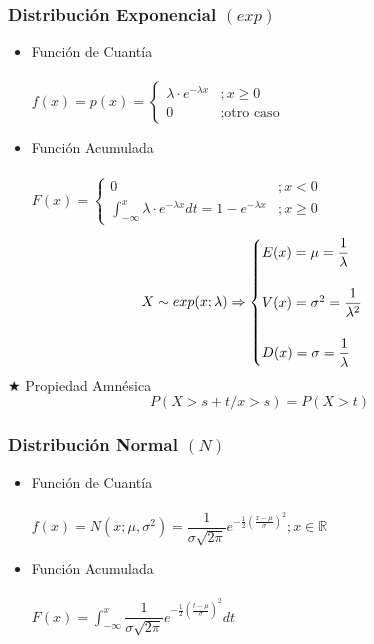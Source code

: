 \documentclass[10pt,letterpaper]{article}
\begin{document}
\subsubsection{Distribución Exponencial $(exp)$}
\begin{multicols}{2}
\begin{itemize}
\item Función de Cuantía \\ \vspace{0.025cm} \\
$f(x)=p(x)=
\begin{cases}
\lambda\cdot e^{-\lambda x} &; x\geq 0 \\
0 &; \text{otro caso}
\end{cases}$
\end{itemize}
\columnbreak
\begin{itemize}
\item Función Acumulada \\ \vspace{0.05cm} \\
$F(x)=
\begin{cases}
0 &; x<0 \\
\displaystyle\int_{-\infty}^{x} \lambda\cdot e^{-\lambda x} dt = 1-e^{-\lambda x} &; x \geq 0
\end{cases}$
\end{itemize}
\end{multicols}
$$
X\sim exp(x;\lambda)\Rightarrow 
\begin{cases}
E(x)=\mu = \dfrac{1}{\lambda} \\ \vspace{0.05cm} \\
V(x)=\sigma^2 = \dfrac{1}{\lambda^2}\\ \vspace{0.05cm} \\
D(x)=\sigma= \dfrac{1}{\lambda}
\end{cases}
$$
$\bigstar$ Propiedad Amnésica 
$$P(X>s+t / x>s) = P(X>t)$$
\subsubsection{Distribución Normal $(N)$}
\begin{multicols}{2}
\begin{itemize}
\item Función de Cuantía \\ \vspace{0.025cm} \\
$f(x)=N(x;\mu,\sigma^2)=\dfrac{1}{\sigma \sqrt{2\pi}} e^{-\frac{1}{2} (\frac{x-\mu}{\sigma})^2 } ;x\in\mathbb{R}$
\end{itemize}
\columnbreak
\begin{itemize}
\item Función Acumulada \\ \vspace{0.05cm} \\
$F(x)=
\displaystyle\int_{-\infty}^{x} \dfrac{1}{\sigma \sqrt{2\pi}} e^{-\frac{1}{2} (\frac{t-\mu}{\sigma})^2 } dt
$
\end{itemize}
\end{multicols}
\end{document}
